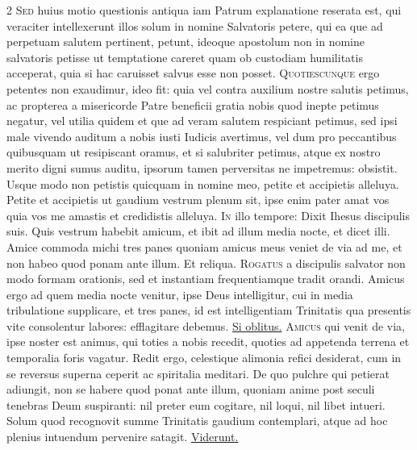 \begin{multicols*}{2}
\lettrine[lines=2]{\zallmancaps \color{Red} S}{ed} huius motio questionis antiqua iam Patrum explanatione reserata est, qui veraciter intellexerunt illos solum in nomine Salvatoris petere, qui ea que ad perpetuam salutem pertinent, petunt, ideoque apostolum non in nomine salvatoris petisse ut temptatione careret quam ob custodiam humilitatis acceperat, quia si hac caruisset salvus esse non posset.
\lettrine[lines=2]{\zallmancaps \color{Blue} Q}{uotiescunque} ergo petentes non exaudimur, ideo fit: quia vel contra auxilium nostre salutis petimus, ac propterea a misericorde Patre beneficii gratia nobis quod inepte petimus negatur, vel utilia quidem et que ad veram salutem respiciant petimus, sed ipsi male vivendo auditum a nobis iusti Iudicis avertimus, vel dum pro peccantibus quibusquam ut resipiscant oramus, et si salubriter petimus, atque ex nostro merito digni sumus auditu, ipsorum tamen perversitas ne impetremus: obsistit.
 Usque modo non petistis quicquam in nomine meo, petite et accipietis alleluya.
 Petite et accipietis ut gaudium vestrum plenum sit, ipse enim pater amat vos quia vos me amastis et credidistis alleluya.
\lettrine[lines=2]{\zallmancaps \color{Red} I}{n} illo tempore: Dixit Ihesus discipulis suis. Quis vestrum habebit amicum, et ibit ad illum media nocte, et dicet illi. Amice commoda michi tres panes quoniam amicus meus veniet de via ad me, et non habeo quod ponam ante illum. Et reliqua.
\lettrine[lines=2]{\zallmancaps \color{Blue} R}{ogatus} a discipulis salvator non modo formam orationis, sed et instantiam frequentiamque tradit orandi. Amicus ergo ad quem media nocte venitur, ipse Deus intelligitur, cui in media tribulatione supplicare, et tres panes, id est intelligentiam Trinitatis qua presentis vite consolentur labores: efflagitare debemus. \R \hyperlink{si-oblitus}{Si oblitus.}
\lettrine[lines=2]{\zallmancaps \color{Red} A}{micus} qui venit de via, ipse noster est animus, qui toties a nobis recedit, quoties ad appetenda terrena et temporalia foris vagatur. Redit ergo, celestique alimonia refici desiderat, cum in se reversus superna ceperit ac spiritalia meditari. De quo pulchre qui petierat adiungit, non se habere quod ponat ante illum, quoniam anime post seculi tenebras Deum suspiranti: nil preter eum cogitare, nil loqui, nil libet intueri. Solum quod recognovit summe Trinitatis gaudium contemplari, atque ad hoc plenius intuendum pervenire satagit. \R \hyperlink{viderunt-te}{Viderunt.}

\end{multicols*}
